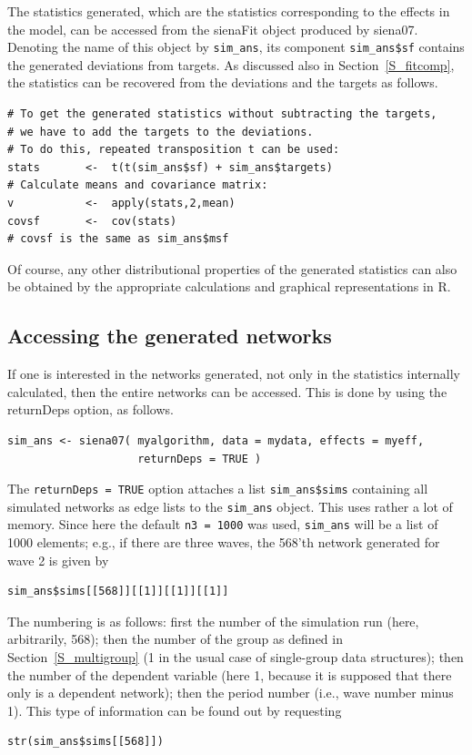 \documentclass[a4paper,fleqn,11pt]{article}
\newcommand{\+}{\, + \,}
\newcommand{\Rn}{{\sf R}}
\newcommand{\SI}{{\sf SIENA }}
\begin{document}

The statistics generated, which are the statistics
corresponding to the effects in the model,
can be accessed from the \textsf{sienaFit}
object produced by \textsf{siena07}.
Denoting the name of this object by \texttt{sim\_ans},
its component  \texttt{sim\_ans\$sf} contains the generated
deviations from targets. As discussed also in Section~\ref{S_fitcomp},
the statistics can be recovered from the deviations and the targets
as follows.
\begin{verbatim}
# To get the generated statistics without subtracting the targets,
# we have to add the targets to the deviations.
# To do this, repeated transposition t can be used:
stats       <-  t(t(sim_ans$sf) + sim_ans$targets)
# Calculate means and covariance matrix:
v           <-  apply(stats,2,mean)
covsf       <-  cov(stats)
# covsf is the same as sim_ans$msf
\end{verbatim}
Of course, any other distributional properties of the
generated statistics can also be obtained by the
appropriate calculations and graphical representations in \Rn.

\subsection{Accessing the generated networks}
\label{S_sims}

If one is interested in the networks generated, not only
in the statistics internally calculated,
then the entire networks can be accessed.
This is done by using the \textsf{returnDeps} option, as follows.
\begin{verbatim}
sim_ans <- siena07( myalgorithm, data = mydata, effects = myeff,
                    returnDeps = TRUE )
\end{verbatim}
The \texttt{returnDeps = TRUE} option attaches a list \texttt{sim\_ans\$sims}
containing all simulated networks
as edge lists to the \texttt{sim\_ans} object.
This uses rather a lot of memory.
Since here the default \texttt{n3 = 1000} was used, \texttt{sim\_ans} will be
a list of 1000 elements; e.g., if there are three waves, the 568'th network generated
for wave 2 is given by
\begin{verbatim}
sim_ans$sims[[568]][[1]][[1]][[1]]
\end{verbatim}
The numbering is as follows: first the number of the simulation run (here,
arbitrarily, 568); then the number of the group as defined in
Section~\ref{S_multigroup} (1 in the usual case of single-group data structures);
then the number of the dependent variable (here 1, because it is supposed
that there only is a dependent network);
then the period number (i.e., wave number minus 1).
This type of information can be found out by requesting
\begin{verbatim}
str(sim_ans$sims[[568]])
\end{verbatim}
\bigskip
\end{document}

